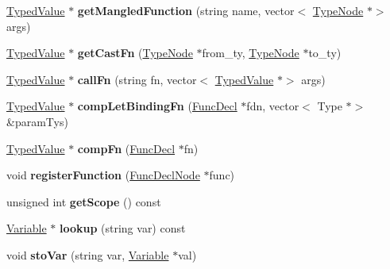 \begin{DoxyCompactItemize}
\hyperlink{structTypedValue}{Typed\+Value} $\ast$ {\bfseries get\+Mangled\+Function} (string name, vector$<$ \hyperlink{structTypeNode}{Type\+Node} $\ast$$>$ args)
\item 
\mbox{\label{structante_1_1Compiler_a6e1fb074b930c471a6c3a1c26870ada8}} 
\hyperlink{structTypedValue}{Typed\+Value} $\ast$ {\bfseries get\+Cast\+Fn} (\hyperlink{structTypeNode}{Type\+Node} $\ast$from\+\_\+ty, \hyperlink{structTypeNode}{Type\+Node} $\ast$to\+\_\+ty)
\item 
\mbox{\label{structante_1_1Compiler_a67505624703cf89322e137b8e3dd5d76}} 
\hyperlink{structTypedValue}{Typed\+Value} $\ast$ {\bfseries call\+Fn} (string fn, vector$<$ \hyperlink{structTypedValue}{Typed\+Value} $\ast$$>$ args)
\item 
\mbox{\label{structante_1_1Compiler_aab84507820503e7858ab2399b9e4aa1c}} 
\hyperlink{structTypedValue}{Typed\+Value} $\ast$ {\bfseries comp\+Let\+Binding\+Fn} (\hyperlink{structFuncDecl}{Func\+Decl} $\ast$fdn, vector$<$ Type $\ast$$>$ \&param\+Tys)
\item 
\mbox{\label{structante_1_1Compiler_a643faf5835a841d25bde4bb3cf3f0632}} 
\hyperlink{structTypedValue}{Typed\+Value} $\ast$ {\bfseries comp\+Fn} (\hyperlink{structFuncDecl}{Func\+Decl} $\ast$fn)
\item 
\mbox{\label{structante_1_1Compiler_af8221f402c22ea704876472fde6475f6}} 
void {\bfseries register\+Function} (\hyperlink{structFuncDeclNode}{Func\+Decl\+Node} $\ast$func)
\item 
\mbox{\label{structante_1_1Compiler_ad9a29d3daf69b8ad5b52e6fb27383fe4}} 
unsigned int {\bfseries get\+Scope} () const
\item 
\mbox{\label{structante_1_1Compiler_a78181a4d893f1188a42424dce22e4f77}} 
\hyperlink{structVariable}{Variable} $\ast$ {\bfseries lookup} (string var) const
\item 
\mbox{\label{structante_1_1Compiler_a294b50b824204a50c10470b4126f8eca}} 
void {\bfseries sto\+Var} (string var, \hyperlink{structVariable}{Variable} $\ast$val)
$$
\end{DoxyCompactItemize}
